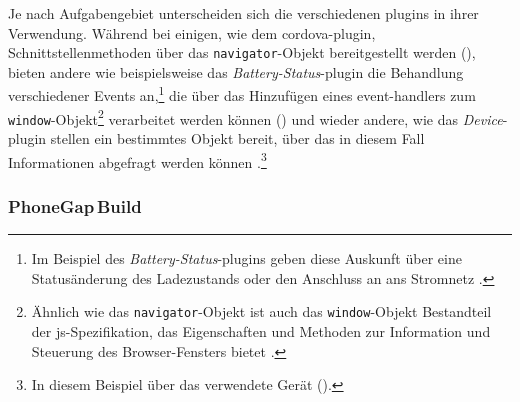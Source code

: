 {Je nach Aufgabengebiet unterscheiden sich die verschiedenen \glspl{plugin} in ihrer Verwendung.
Während bei einigen, wie \zB dem \gls{cordova}-\gls{plugin}, Schnittstellenmethoden über das \lstinline|navigator|-Objekt bereitgestellt werden (), bieten andere wie beispielsweise das \emph{Battery-Status}-\gls{plugin} die Behandlung verschiedener Events an,\footnote{Im Beispiel des \emph{Battery-Status}-\glspl{plugin} geben diese Auskunft über eine Statusänderung des Ladezustands oder den Anschluss an ans Stromnetz \cite{Cordova_Plugin_Registry_battery-status}.} die über das Hinzufügen eines \glspl{event-handler} zum \lstinline|window|-Objekt\footnote{Ähnlich wie das \lstinline|navigator|-Objekt ist auch das \lstinline|window|-Objekt Bestandteil der \gls{js}-Spezifikation, das Eigenschaften und Methoden zur Information und Steuerung des Browser-Fensters  bietet \cite{selfhtml_window}.} verarbeitet werden können () und wieder andere, wie \zB das \emph{Device}-\gls{plugin} stellen ein bestimmtes Objekt bereit, über das in diesem Fall Informationen abgefragt werden können \cite{Cordova_Plugin_Registry_Contacts, Cordova_Plugin_Registry_battery-status, Cordova_Plugin_Registry_device}.\footnote{In diesem Beispiel über das verwendete Gerät ().}




\subsubsection{PhoneGap\,Build}	\label{sec:pg-build}		%

}
